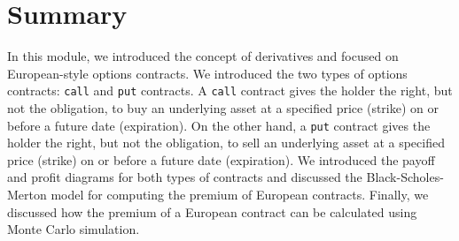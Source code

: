 \documentclass[11pt]{article}
\theoremstyle{definition}
\begin{document}
\section*{Summary}
In this module, we introduced the concept of derivatives and focused on European-style options contracts. 
We introduced the two types of options contracts: \texttt{call} and \texttt{put} contracts. 
A \texttt{call} contract gives the holder the right, but not the obligation, to buy an underlying asset at a specified price (strike) 
on or before a future date (expiration). On the other hand, a \texttt{put} contract gives the holder the right, but not the obligation, 
to sell an underlying asset at a specified price (strike) on or before a future date (expiration). 
We introduced the payoff and profit diagrams for both types of contracts and discussed 
the Black-Scholes-Merton model for computing the premium of European contracts. 
Finally, we discussed how the premium of a European contract can be calculated using Monte Carlo simulation.



\clearpage
\printindex
\end{document}
